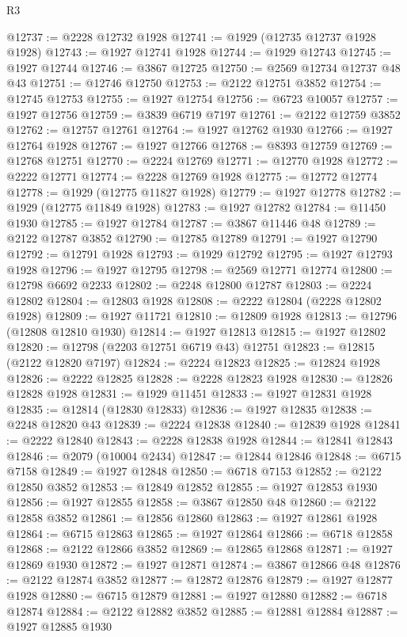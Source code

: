 \begin{lexlean}{R3}
\begin{coremodule}
@12737 := @2228 @12732 @1928
@12741 := @1929 (@12735 @12737 @1928 @1928)
@12743 := @1927 @12741 @1928
@12744 := @1929 @12743
@12745 := @1927 @12744
@12746 := @3867 @12725
@12750 := @2569 @12734 @12737 @48 @43
@12751 := @12746 @12750
@12753 := @2122 @12751 @3852
@12754 := @12745 @12753
@12755 := @1927 @12754
@12756 := @6723 @10057
@12757 := @1927 @12756
@12759 := @3839 @6719 @7197
@12761 := @2122 @12759 @3852
@12762 := @12757 @12761
@12764 := @1927 @12762 @1930
@12766 := @1927 @12764 @1928
@12767 := @1927 @12766
@12768 := @8393 @12759
@12769 := @12768 @12751
@12770 := @2224 @12769
@12771 := @12770 @1928
@12772 := @2222 @12771
@12774 := @2228 @12769 @1928
@12775 := @12772 @12774
@12778 := @1929 (@12775 @11827 @1928)
@12779 := @1927 @12778
@12782 := @1929 (@12775 @11849 @1928)
@12783 := @1927 @12782
@12784 := @11450 @1930
@12785 := @1927 @12784
@12787 := @3867 @11446 @48
@12789 := @2122 @12787 @3852
@12790 := @12785 @12789
@12791 := @1927 @12790
@12792 := @12791 @1928
@12793 := @1929 @12792
@12795 := @1927 @12793 @1928
@12796 := @1927 @12795
@12798 := @2569 @12771 @12774
@12800 := @12798 @6692 @2233
@12802 := @2248 @12800 @12787
@12803 := @2224 @12802
@12804 := @12803 @1928
@12808 := @2222 @12804 (@2228 @12802 @1928)
@12809 := @1927 @11721
@12810 := @12809 @1928
@12813 := @12796 (@12808 @12810 @1930)
@12814 := @1927 @12813
@12815 := @1927 @12802
@12820 := @12798 (@2203 @12751 @6719 @43) @12751
@12823 := @12815 (@2122 @12820 @7197)
@12824 := @2224 @12823
@12825 := @12824 @1928
@12826 := @2222 @12825
@12828 := @2228 @12823 @1928
@12830 := @12826 @12828 @1928
@12831 := @1929 @11451
@12833 := @1927 @12831 @1928
@12835 := @12814 (@12830 @12833)
@12836 := @1927 @12835
@12838 := @2248 @12820 @43
@12839 := @2224 @12838
@12840 := @12839 @1928
@12841 := @2222 @12840
@12843 := @2228 @12838 @1928
@12844 := @12841 @12843
@12846 := @2079 (@10004 @2434)
@12847 := @12844 @12846
@12848 := @6715 @7158
@12849 := @1927 @12848
@12850 := @6718 @7153
@12852 := @2122 @12850 @3852
@12853 := @12849 @12852
@12855 := @1927 @12853 @1930
@12856 := @1927 @12855
@12858 := @3867 @12850 @48
@12860 := @2122 @12858 @3852
@12861 := @12856 @12860
@12863 := @1927 @12861 @1928
@12864 := @6715 @12863
@12865 := @1927 @12864
@12866 := @6718 @12858
@12868 := @2122 @12866 @3852
@12869 := @12865 @12868
@12871 := @1927 @12869 @1930
@12872 := @1927 @12871
@12874 := @3867 @12866 @48
@12876 := @2122 @12874 @3852
@12877 := @12872 @12876
@12879 := @1927 @12877 @1928
@12880 := @6715 @12879
@12881 := @1927 @12880
@12882 := @6718 @12874
@12884 := @2122 @12882 @3852
@12885 := @12881 @12884
@12887 := @1927 @12885 @1930

\end{coremodule}
\end{lexlean}
